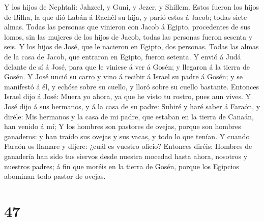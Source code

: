  Y los hijos de Nephtalí: Jahzeel, y Guni, y Jezer, y
Shillem.  Estos fueron los hijos de Bilha, la que dió Labán
á Rachêl su hija, y parió estos á Jacob; todas siete almas.
 Todas las personas que vinieron con Jacob á Egipto,
procedentes de sus lomos, sin las mujeres de los hijos de Jacob, todas
las personas fueron sesenta y seis.  Y los hijos de José,
que le nacieron en Egipto, dos personas. Todas las almas de la casa de
Jacob, que entraron en Egipto, fueron setenta.  Y envió á
Judá delante de sí á José, para que le viniese á ver á Gosén; y llegaron
á la tierra de Gosén.  Y José unció su carro y vino á
recibir á Israel su padre á Gosén; y se manifestó á él, y echóse sobre
su cuello, y lloró sobre su cuello bastante.  Entonces
Israel dijo á José: Muera yo ahora, ya que he visto tu rostro, pues aun
vives.  Y José dijo á sus hermanos, y á la casa de su
padre: Subiré y haré saber á Faraón, y diréle: Mis hermanos y la casa de
mi padre, que estaban en la tierra de Canaán, han venido á mí;
 Y los hombres son pastores de ovejas, porque son hombres
ganaderos: y han traído sus ovejas y sus vacas, y todo lo que tenían.
 Y cuando Faraón os llamare y dijere: ¿cuál es vuestro
oficio?  Entonces diréis: Hombres de ganadería han sido tus
siervos desde nuestra mocedad hasta ahora, nosotros y nuestros padres; á
fin que moréis en la tierra de Gosén, porque los Egipcios abominan todo
pastor de ovejas.

\hypertarget{section-46}{%
\section{47}\label{section-46}}

